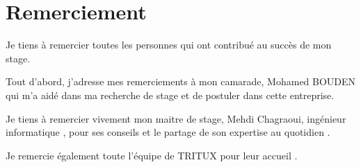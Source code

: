 \documentclass[a4paper,12pt,french]{article}
\newcommand{\director}{Mehdi Chagraoui}
\begin{document}
\clearpage
\fancypage{}{}
\renewcommand{\headrulewidth}{2pt}
\fancyhead[L]{\footnotesize{ \thetitle}}

\renewcommand{\footrulewidth}{2pt}
\fancyfoot[L]{\footnotesize \theauthor}
\fancyfoot[R]{\footnotesize  \thepage}


\vspace*{2cm}




\section*{Remerciement}
Je tiens à remercier toutes les personnes   qui ont contribué au succès de mon stage.

Tout d'abord, j'adresse mes remerciements à mon camarade, Mohamed BOUDEN qui m'a aidé dans ma recherche de stage et  de postuler dans cette entreprise.

Je tiens à remercier vivement mon maitre de stage, \director , ingénieur informatique , pour ses conseils et le partage de son expertise au quotidien .

Je remercie également toute l’équipe de TRITUX pour leur accueil .

\clearpage

\begin{spacing}{1}	
\tableofcontents
\end{spacing}
\thispagestyle{empty}
\clearpage

\listoffigures
{}

\clearpage







\newpage
\setcounter{page}{1}





\newpage



\newpage

\end{document}
